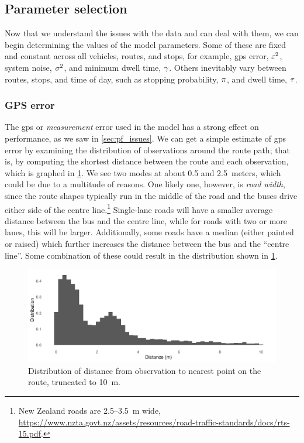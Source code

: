 \subsection{Parameter selection}
\label{sec:pf_params}

Now that we understand the issues with the data and can deal with them, we can begin determining the values of the model parameters. Some of these are fixed and constant across all vehicles, routes, and stops, for example, \gls{gps} error, $\varepsilon^2$, system noise, $\sigma^2$, and minimum dwell time, $\gamma$. Others inevitably vary between routes, stops, and time of day, such as stopping probability, $\pi$, and dwell time, $\tau$.


\subsubsection{GPS error}
\label{sec:pf_params_gps}

The \gls{gps} or \emph{measurement} error used in the model has a strong effect on performance, as we saw in \cref{sec:pf_issues}. We can get a simple estimate of \gls{gps} error by examining the distribution of observations around the route path; that is, by computing the shortest distance between the route and each observation, which is graphed in \cref{fig:pf_param_gps}. We see two modes at about 0.5 and 2.5~meters, which could be due to a multitude of reasons. One likely one, however, is \emph{road width}, since the route shapes typically run in the middle of the road and the buses drive either side of the centre line.\footnote{New Zealand roads are 2.5--3.5~m wide, \url{https://www.nzta.govt.nz/assets/resources/road-traffic-standards/docs/rts-15.pdf}.} Single-lane roads will have a smaller average distance between the bus and the centre line, while for roads with two or more lanes, this will be larger. Additionally, some roads have a median (either painted or raised) which further increases the distance between the bus and the ``centre line''. Some combination of these could result in the distribution shown in \cref{fig:pf_param_gps}.



\begin{knitrout}\small
{}\color{fgcolor}\begin{figure}
\includegraphics[width=\maxwidth]{figure/pf_param_gps-1} \caption[Distribution of distance from observation to nearest point on the route, truncated to 10~m]{Distribution of distance from observation to nearest point on the route, truncated to 10~m.}\label{fig:pf_param_gps}
\end{figure}


\end{knitrout}

